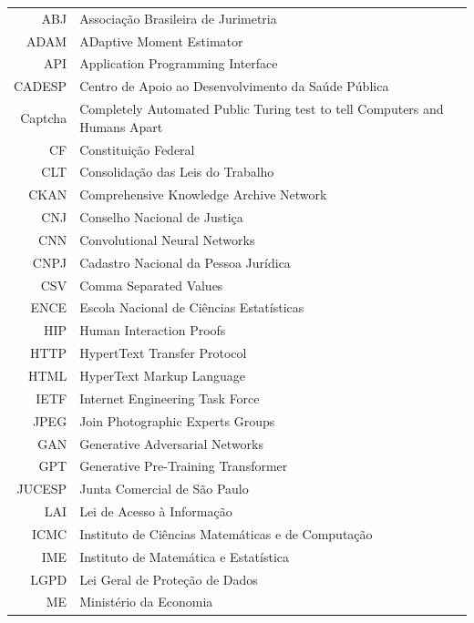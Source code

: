\documentclass[12pt,twoside,brazilian]{book}
\begin{document}
\begin{tabular}{rl}
   ABJ & Associação Brasileira de Jurimetria\\
   ADAM & ADaptive Moment Estimator\\
   API & Application Programming Interface\\
   CADESP & Centro de Apoio ao Desenvolvimento da Saúde Pública\\
   Captcha & Completely Automated Public Turing test to tell Computers and Humans Apart\\
   CF & Constituição Federal\\
   CLT & Consolidação das Leis do Trabalho\\
   CKAN & Comprehensive Knowledge Archive Network\\
   CNJ & Conselho Nacional de Justiça\\
   CNN & Convolutional Neural Networks\\
   CNPJ & Cadastro Nacional da Pessoa Jurídica\\
   CSV & Comma Separated Values\\
   ENCE & Escola Nacional de Ciências Estatísticas\\
   HIP & Human Interaction Proofs\\
   HTTP & HypertText Transfer Protocol\\
   HTML & HyperText Markup Language\\
   IETF & Internet Engineering Task Force\\
   JPEG & Join Photographic Experts Groups\\
   GAN & Generative Adversarial Networks\\
   GPT & Generative Pre-Training Transformer\\
   JUCESP & Junta Comercial de São Paulo\\
   LAI & Lei de Acesso à Informação\\
   ICMC & Instituto de Ciências Matemáticas e de Computação\\
   IME & Instituto de Matemática e Estatística\\
   LGPD & Lei Geral de Proteção de Dados\\
   ME & Ministério da Economia\\
\end{tabular}
\end{document}
